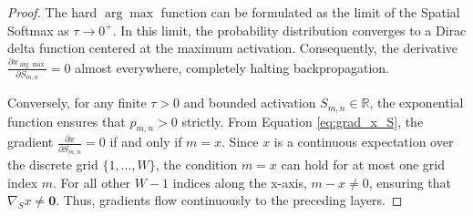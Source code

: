 \documentclass[onecolumn]{IEEEtran}
\numberwithin{equation}{section}
\theoremstyle{definition}
\theoremstyle{remark}
\begin{document}
\begin{proof}
The hard \(\arg\max\) function can be formulated as the limit of the Spatial Softmax as \(\tau \to 0^+\). In this limit, the probability distribution converges to a Dirac delta function centered at the maximum activation. Consequently, the derivative \(\frac{\partial x_{\arg\max}}{\partial S_{m,n}} = 0\) almost everywhere, completely halting backpropagation. 

Conversely, for any finite \(\tau > 0\) and bounded activation \(S_{m,n} \in \mathbb{R}\), the exponential function ensures that \(p_{m,n} > 0\) strictly. From Equation \ref{eq:grad_x_S}, the gradient \(\frac{\partial x}{\partial S_{m,n}} = 0\) if and only if \(m = x\). Since \(x\) is a continuous expectation over the discrete grid \(\{1, \dots, W\}\), the condition \(m = x\) can hold for at most one grid index \(m\). For all other \(W-1\) indices along the x-axis, \(m - x \neq 0\), ensuring that \(\nabla_S x \neq \mathbf{0}\). Thus, gradients flow continuously to the preceding layers.
\end{proof}
\end{document}
